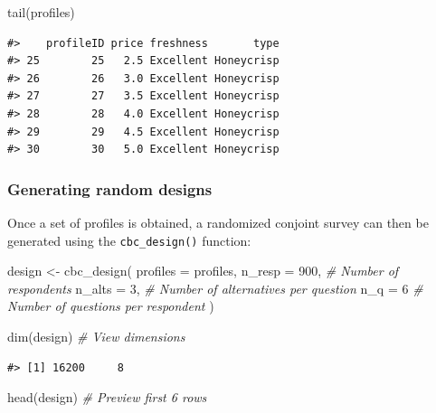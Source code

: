 \documentclass[
  12pt,
]{article}
\newenvironment{Shaded}{\begin{snugshade}}{\end{snugshade}}
\newcommand{\AttributeTok}[1]{\textcolor[rgb]{0.77,0.63,0.00}{#1}}
\newcommand{\CommentTok}[1]{\textcolor[rgb]{0.56,0.35,0.01}{\textit{#1}}}
\newcommand{\DecValTok}[1]{\textcolor[rgb]{0.00,0.00,0.81}{#1}}
\newcommand{\FunctionTok}[1]{\textcolor[rgb]{0.00,0.00,0.00}{#1}}
\newcommand{\NormalTok}[1]{#1}
\newcommand{\OtherTok}[1]{\textcolor[rgb]{0.56,0.35,0.01}{#1}}
\begin{document}
\begin{Shaded}
\begin{Highlighting}[]
\FunctionTok{tail}\NormalTok{(profiles)}
\end{Highlighting}
\end{Shaded}

\begin{verbatim}
#>    profileID price freshness       type
#> 25        25   2.5 Excellent Honeycrisp
#> 26        26   3.0 Excellent Honeycrisp
#> 27        27   3.5 Excellent Honeycrisp
#> 28        28   4.0 Excellent Honeycrisp
#> 29        29   4.5 Excellent Honeycrisp
#> 30        30   5.0 Excellent Honeycrisp
\end{verbatim}

\hypertarget{generating-random-designs}{%
\subsubsection{Generating random
designs}\label{generating-random-designs}}

Once a set of profiles is obtained, a randomized conjoint survey can
then be generated using the \texttt{cbc\_design()} function:

\begin{Shaded}
\begin{Highlighting}[]
\NormalTok{design }\OtherTok{\textless{}{-}} \FunctionTok{cbc\_design}\NormalTok{(}
  \AttributeTok{profiles =}\NormalTok{ profiles,}
  \AttributeTok{n\_resp   =} \DecValTok{900}\NormalTok{, }\CommentTok{\# Number of respondents}
  \AttributeTok{n\_alts   =} \DecValTok{3}\NormalTok{,   }\CommentTok{\# Number of alternatives per question}
  \AttributeTok{n\_q      =} \DecValTok{6}    \CommentTok{\# Number of questions per respondent}
\NormalTok{)}

\FunctionTok{dim}\NormalTok{(design)  }\CommentTok{\# View dimensions}
\end{Highlighting}
\end{Shaded}

\begin{verbatim}
#> [1] 16200     8
\end{verbatim}

\begin{Shaded}
\begin{Highlighting}[]
\FunctionTok{head}\NormalTok{(design) }\CommentTok{\# Preview first 6 rows}
\end{Highlighting}
\end{Shaded}
\end{document}
